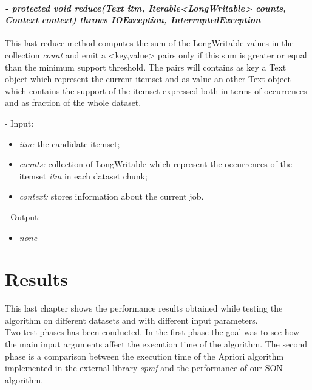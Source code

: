 \documentclass[]{report}
\begin{document}
	\subsubsection*{\textit{\textbf{-} protected void reduce(Text itm, Iterable<LongWritable> counts, Context context) throws IOException, InterruptedException}}   	
	This last reduce method computes the sum of the LongWritable values in the collection \textit{count} and emit a <key,value> pairs only if this sum is greater or equal than the minimum support threshold. The pairs will contains as key a Text object which represent the current itemset and as value an other Text object which contains the support of the itemset expressed both in terms of occurrences and as fraction of the whole dataset.
	\begin{description}
		\item - Input:
		\begin{itemize}
			\item \textit{itm:} the candidate itemset;
			\item \textit{counts:} collection of LongWritable which represent the occurrences of the itemset \textit{itm} in each dataset chunk; 
			\item \textit{context:} stores information about the current job.
		\end{itemize}
	\end{description}	
	\begin{description}
		\item - Output:
		\begin{itemize}
			\item \textit{none} 
		\end{itemize}
	\end{description}
	
	
\chapter*{\huge Results} 

	This last chapter shows the performance results obtained while testing the algorithm on different datasets and with different input parameters.\\
	Two test phases has been conducted. In the first phase the goal was to see how the main input arguments affect the execution time of the algorithm. The second phase is a comparison between the execution time of the Apriori algorithm implemented in the external library \textit{spmf} and the performance of our SON algorithm. 
   	
\end{document}
